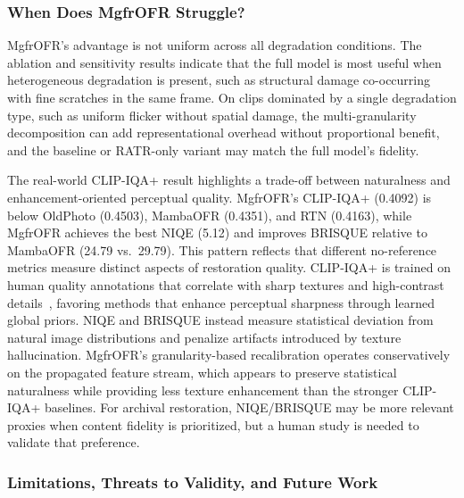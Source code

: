 \documentclass[symmetry,article,submit,pdftex,moreauthors]{Definitions/mdpi}
\begin{document}
\subsubsection{When Does MgfrOFR Struggle?}
\label{subsec:failure}

MgfrOFR's advantage is not uniform across all degradation conditions. The ablation and sensitivity results indicate that the full model is most useful when heterogeneous degradation is present, such as structural damage co-occurring with fine scratches in the same frame. On clips dominated by a single degradation type, such as uniform flicker without spatial damage, the multi-granularity decomposition can add representational overhead without proportional benefit, and the baseline or RATR-only variant may match the full model's fidelity.

The real-world CLIP-IQA+ result highlights a trade-off between naturalness and enhancement-oriented perceptual quality. MgfrOFR's CLIP-IQA+ (0.4092) is below OldPhoto (0.4503), MambaOFR (0.4351), and RTN (0.4163), while MgfrOFR achieves the best NIQE (5.12) and improves BRISQUE relative to MambaOFR (24.79 vs.\ 29.79). This pattern reflects that different no-reference metrics measure distinct aspects of restoration quality. CLIP-IQA+ is trained on human quality annotations that correlate with sharp textures and high-contrast details~\cite{wang2023clipiqa}, favoring methods that enhance perceptual sharpness through learned global priors. NIQE and BRISQUE instead measure statistical deviation from natural image distributions and penalize artifacts introduced by texture hallucination. MgfrOFR's granularity-based recalibration operates conservatively on the propagated feature stream, which appears to preserve statistical naturalness while providing less texture enhancement than the stronger CLIP-IQA+ baselines. For archival restoration, NIQE/BRISQUE may be more relevant proxies when content fidelity is prioritized, but a human study is needed to validate that preference.

\subsubsection{Limitations, Threats to Validity, and Future Work}
\label{subsec:limitations}
\end{document}
